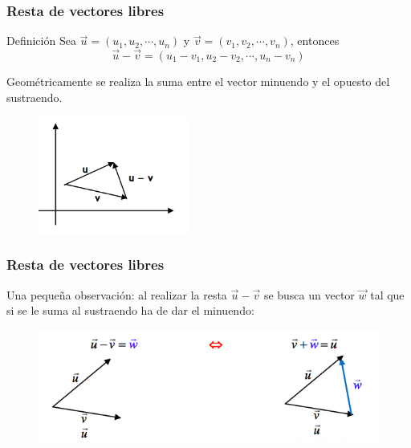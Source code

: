 \documentclass{beamer}
\begin{document}
\begin{frame}
  \frametitle{Resta de vectores libres}
  
  \begin{block}{Definici\'on}
Sea $\vec{u} = (u_1,u_2, \cdots, u_n)$ y $\vec{v} = (v_1,v_2,\cdots,v_n)$, entonces
\[\vec{u}-\vec{v} = (u_1-v_1, u_2-v_2, \cdots, u_n-v_n)\]
\end{block}
Geom\'etricamente se realiza la suma entre el vector minuendo y el opuesto del sustraendo.
\begin{figure}[h]
    \label{fig:resta}
\centering
\includegraphics[width = 5cm]{resta}
\end{figure}
\end{frame}


\begin{frame}
  \frametitle{Resta de vectores libres}
  

Una peque\~na observaci\'on: al realizar la resta $\vec{u} - \vec{v}$ se busca un vector $\vec{w}$ tal que si se le suma al sustraendo ha de dar el minuendo:
\begin{figure}[h]
    \label{fig:resta}
\centering
\includegraphics[width = \textwidth]{resta_2}
\end{figure}
\end{frame}
\end{document}
